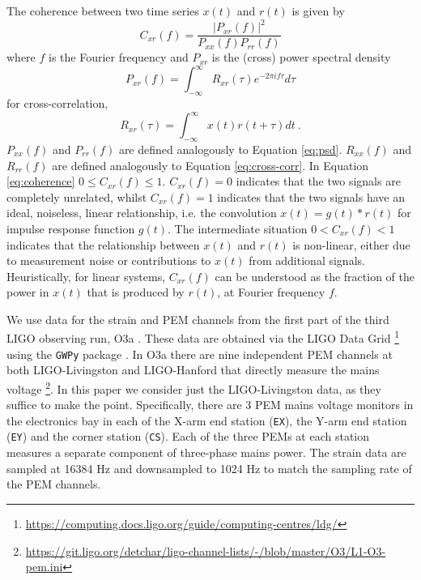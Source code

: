 \documentclass[pra,superscriptaddress,reprint,amsmath,amssymb,nofootinbib]{revtex4-2}
\begin{document}
The coherence between two time series $x(t)$ and $r(t)$ is given by 
\begin{equation}
	C_{xr}(f)	= \frac{|P_{xr}(f)|^2}{P_{xx}(f) P_{rr}(f)}  \label{eq:coherence}
\end{equation}
where $f$ is the Fourier frequency and $P_{xr}$ is the (cross) power spectral density
\begin{equation}
	P_{xr}(f)	= \int_{-\infty}^{\infty} R_{xr}(\tau) e^{-2 \pi i f \tau } d \tau    \label{eq:psd}
\end{equation}
for cross-correlation,
\begin{equation}
	R_{xr}(\tau) = \int_{-\infty}^{\infty} x(t) r(t+ \tau) dt \ .  \label{eq:cross-corr}
\end{equation}
$P_{xx}(f)$ and $P_{rr}(f)$ are defined analogously to Equation \eqref{eq:psd}. $R_{xx}(f)$ and $R_{rr}(f)$ are defined analogously to Equation \eqref{eq:cross-corr}. In Equation \eqref{eq:coherence} $0 \leq C_{xr}(f) \leq 1$. $C_{xr}(f) = 0$ indicates that the two signals are completely unrelated, whilst $C_{xr}(f) = 1$ indicates that the two signals have an ideal, noiseless, linear relationship, i.e. the convolution $x(t) = g(t) \ast r(t)$ for impulse response function $g(t)$.  The intermediate situation $ 0 < C_{xr}(f) < 1$ indicates that the relationship between $x(t)$ and $r(t)$ is non-linear, either due to measurement noise or contributions to $x(t)$ from additional signals. Heuristically, for linear systems, $C_{xr}(f)$ can be understood as the fraction of the power in $x(t)$ that is produced by $r(t)$, at Fourier frequency $f$. \newline 


We use data for the strain and PEM channels from the first part of the third LIGO observing run, O3a \cite{LIGO_O3}. These data are obtained via the LIGO Data Grid  \footnote{\url{https://computing.docs.ligo.org/guide/computing-centres/ldg/}} using the \texttt{GWPy} package \cite{gwpy}. In O3a there are nine independent PEM channels at both LIGO-Livingston and LIGO-Hanford that directly measure the mains voltage \footnote{\url{https://git.ligo.org/detchar/ligo-channel-lists/-/blob/master/O3/L1-O3-pem.ini}}. In this paper we consider just the LIGO-Livingston data, as they suffice to make the point. Specifically, there are 3 PEM mains voltage monitors in the electronics bay in each of the X-arm end station (\texttt{EX}), the Y-arm end station (\texttt{EY}) and the corner station (\texttt{CS}). Each of the three PEMs at each station measures a separate component of three-phase mains power. The strain data are sampled at 16384 Hz and downsampled to 1024 Hz to match the sampling rate of the PEM channels. \newline 
\end{document}
